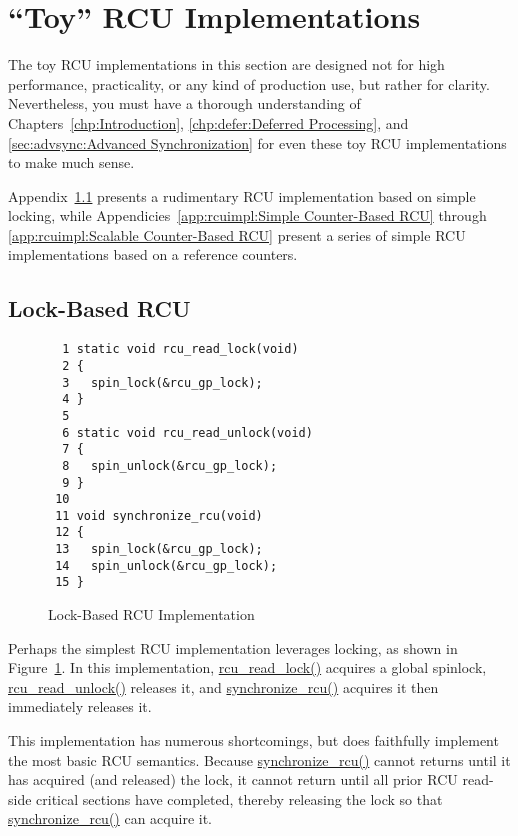 
\section{``Toy'' RCU Implementations}
\label{app:rcuimpl:``Toy'' RCU Implementations}

The toy RCU implementations in this section are designed not for
high performance, practicality, or any kind of production use,
but rather for clarity.
Nevertheless, you must have a thorough understanding of
Chapters~\ref{chp:Introduction},
\ref{chp:defer:Deferred Processing}, and
\ref{sec:advsync:Advanced Synchronization}
for even these toy RCU implementations to make much sense.

Appendix~\ref{app:rcuimpl:Lock-Based RCU} presents a rudimentary
RCU implementation based on simple locking, while
Appendicies~\ref{app:rcuimpl:Simple Counter-Based RCU} through
\ref{app:rcuimpl:Scalable Counter-Based RCU} present a series of
simple RCU implementations based on a reference counters.

\subsection{Lock-Based RCU}
\label{app:rcuimpl:Lock-Based RCU}

\begin{figure}[bp]
{ \scriptsize
\begin{verbatim}
  1 static void rcu_read_lock(void)
  2 {
  3   spin_lock(&rcu_gp_lock);
  4 }
  5 
  6 static void rcu_read_unlock(void)
  7 {
  8   spin_unlock(&rcu_gp_lock);
  9 }
 10 
 11 void synchronize_rcu(void)
 12 {
 13   spin_lock(&rcu_gp_lock);
 14   spin_unlock(&rcu_gp_lock);
 15 }
\end{verbatim}
}
\caption{Lock-Based RCU Implementation}
\label{fig:app:rcuimpl:Lock-Based RCU Implementation}
\end{figure}

Perhaps the simplest RCU implementation leverages locking, as
shown in
Figure~\ref{fig:app:rcuimpl:Lock-Based RCU Implementation}.
In this implementation, \url{rcu_read_lock()} acquires a global
spinlock, \url{rcu_read_unlock()} releases it, and
\url{synchronize_rcu()} acquires it then immediately releases it.

This implementation has numerous shortcomings, but does faithfully
implement the most basic RCU semantics.
Because \url{synchronize_rcu()} cannot returns until it has acquired
(and released) the lock, it cannot return until all prior RCU read-side
critical sections have completed, thereby releasing the lock so that
\url{synchronize_rcu()} can acquire it.

